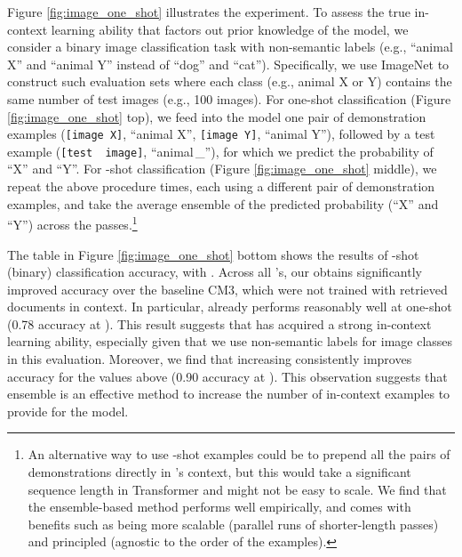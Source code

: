 Figure \ref{fig:image_one_shot} illustrates the experiment.
To assess the true in-context learning ability that factors out prior knowledge of the model, we consider a binary image classification task with non-semantic labels (e.g., ``animal X'' and ``animal Y'' instead of ``dog'' and ``cat''). Specifically, we use ImageNet \cite{deng2009imagenet} to construct such evaluation sets where each class (e.g., animal X or Y) contains the same number of test images (e.g., 100 images).
For one-shot classification (Figure \ref{fig:image_one_shot} top), we feed into the model one pair of demonstration examples (\texttt{[image\,X]}, ``animal X'', \texttt{[image\,Y]}, ``animal Y''), followed by a test example (\texttt{[test\,\,image]}, ``animal\,\_''), for which we predict the probability of ``X'' and ``Y''. 
For -shot classification (Figure \ref{fig:image_one_shot} middle), we repeat the above procedure  times, each using a different pair of demonstration examples, and take the average ensemble of the predicted probability (``X'' and ``Y'') across the  passes.\footnote{An alternative way to use -shot examples could be to prepend all the  pairs of demonstrations directly in \methodname's context, but this would take a significant sequence length in Transformer and might not be easy to scale. 
We find that the ensemble-based method performs well empirically, and comes with benefits such as being more scalable (parallel runs of shorter-length passes) and principled (agnostic to the order of the  examples).}

The table in Figure \ref{fig:image_one_shot} bottom shows the results of -shot (binary) classification accuracy, with .
Across all 's, our \methodname obtains significantly improved accuracy over the baseline CM3, which were not trained with retrieved documents in context. In particular, \methodname already performs reasonably well at one-shot (0.78 accuracy at ). This result suggests that \methodname has acquired a strong in-context learning ability, especially given that we use non-semantic labels for image classes in this evaluation.
Moreover, we find that increasing  consistently improves accuracy for the  values above (0.90 accuracy at ). 
This observation suggests that ensemble is an effective method to increase the number of in-context examples to provide for the model.
